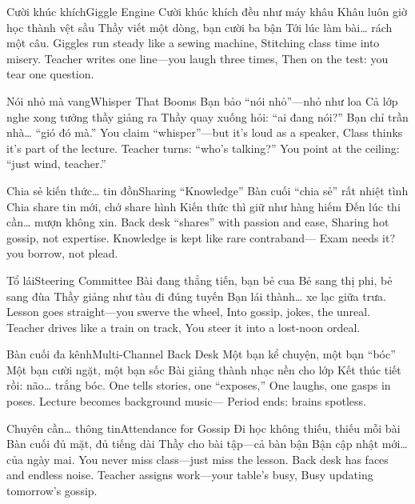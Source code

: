 \begin{tutuyetbox}{Cười khúc khích}{Giggle Engine}
Cười khúc khích đều như máy khâu
Khâu luôn giờ học thành vệt sầu
Thầy viết một dòng, bạn cười ba bận
Tới lúc làm bài… rách một câu.
\tcblower
Giggles run steady like a sewing machine,
Stitching class time into misery.
Teacher writes one line—you laugh three times,
Then on the test: you tear one question.
\end{tutuyetbox}

\begin{tutuyetbox}{Nói nhỏ mà vang}{Whisper That Booms}
Bạn bảo “nói nhỏ”—nhỏ như loa
Cả lớp nghe xong tưởng thầy giảng ra
Thầy quay xuống hỏi: “ai đang nói?”
Bạn chỉ trần nhà… “gió đó mà.”
\tcblower
You claim “whisper”—but it’s loud as a speaker,
Class thinks it’s part of the lecture.
Teacher turns: “who’s talking?”
You point at the ceiling: “just wind, teacher.”
\end{tutuyetbox}

\begin{tutuyetbox}{Chia sẻ kiến thức… tin đồn}{Sharing “Knowledge”}
Bàn cuối “chia sẻ” rất nhiệt tình
Chia share tin mới, chớ share hình
Kiến thức thì giữ như hàng hiếm
Đến lúc thi cần… mượn không xin.
\tcblower
Back desk “shares” with passion and ease,
Sharing hot gossip, not expertise.
Knowledge is kept like rare contraband—
Exam needs it? you borrow, not plead.
\end{tutuyetbox}

\begin{tutuyetbox}{Tổ lái}{Steering Committee}
Bài đang thẳng tiến, bạn bẻ cua
Bẻ sang thị phi, bẻ sang đùa
Thầy giảng như tàu đi đúng tuyến
Bạn lái thành… xe lạc giữa trưa.
\tcblower
Lesson goes straight—you swerve the wheel,
Into gossip, jokes, the unreal.
Teacher drives like a train on track,
You steer it into a lost-noon ordeal.
\end{tutuyetbox}

\begin{tutuyetbox}{Bàn cuối đa kênh}{Multi-Channel Back Desk}
Một bạn kể chuyện, một bạn “bóc”
Một bạn cười ngặt, một bạn sốc
Bài giảng thành nhạc nền cho lớp
Kết thúc tiết rồi: não… trắng bóc.
\tcblower
One tells stories, one “exposes,”
One laughs, one gasps in poses.
Lecture becomes background music—
Period ends: brains spotless.
\end{tutuyetbox}

\begin{tutuyetbox}{Chuyên cần… thông tin}{Attendance for Gossip}
Đi học không thiếu, thiếu mỗi bài
Bàn cuối đủ mặt, đủ tiếng dài
Thầy cho bài tập—cả bàn bận
Bận cập nhật mới… của ngày mai.
\tcblower
You never miss class—just miss the lesson.
Back desk has faces and endless noise.
Teacher assigns work—your table’s busy,
Busy updating tomorrow’s gossip.
\end{tutuyetbox}

